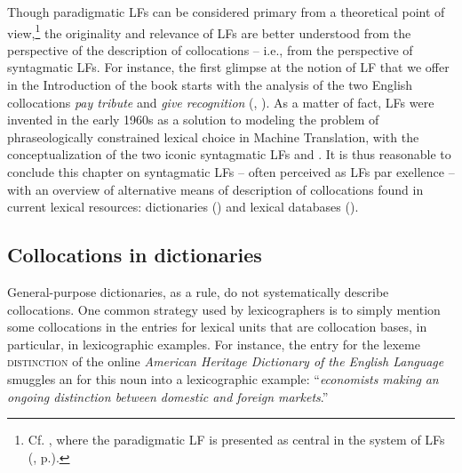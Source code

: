 Though paradigmatic LFs can be considered primary from a theoretical point of view,\footnote{Cf. , where the paradigmatic LF  is presented as central in the system of LFs (, p.\thinspace\pageref{sec:troisPiliersFL}).} the originality and relevance of LFs are better understood from the perspective of the description of collocations -- i.e., from the perspective of syntagmatic LFs. For instance, the first glimpse at the notion of LF that we offer in the Introduction of the book starts with the analysis of the two English collocations \textit{pay tribute} and \textit{give recognition} (, ). As a matter of fact, LFs were invented in the early 1960s as a solution to modeling the problem of phraseologically constrained lexical choice in Machine Translation, with the conceptualization of the two iconic syntagmatic LFs  and  \parencite[Ch.~14, Sec.~8, p.~269]{Melcuk2015a-e}.
It is thus reasonable to conclude this chapter on syntagmatic LFs -- often perceived as LFs par exellence
-- with an overview of alternative means of description of collocations found in current lexical resources: dictionaries () and lexical databases ().

\subsection{Collocations in dictionaries}\label{sec:collocationsInDictionaries}

General-purpose dictionaries, as a rule, do not systematically describe collocations. One common strategy used by lexicographers is to simply mention some collocations in the entries for lexical units that are collocation bases, in particular, in lexicographic examples. For instance, the entry for the lexeme \textsc{distinction} of the online \textit{American Heritage Dictionary of the English Language} \parencite{AmericanHeritage2022} smuggles an  for this noun into a lexicographic example: ``\textit{economists making} \textit{an ongoing distinction between domestic and foreign markets}.''

